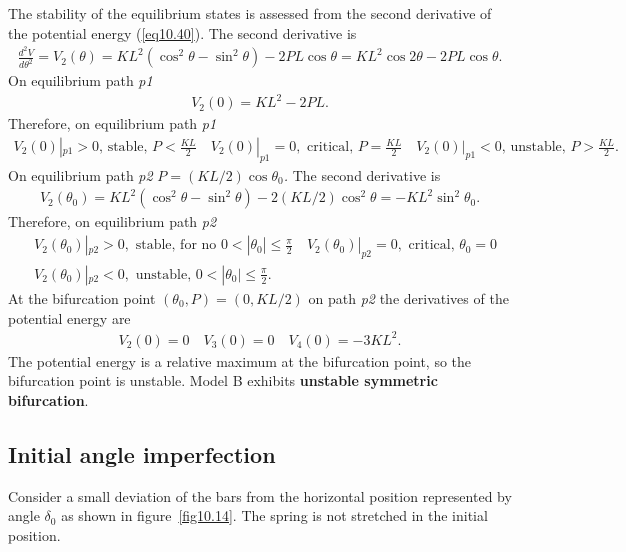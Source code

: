 \documentclass{AeroStructure-ERJohnson}
\begin{document}
The stability of the equilibrium states is assessed from the second derivative of the potential energy (\ref{eq10.40}). The second derivative is
\begin{align}\label{eq10.43}
\frac{d^{2} V}{d \theta^{2}}=V_{2}(\theta)=K L^{2}(\cos ^{2} \theta-\sin ^{2} \theta)-2 P L \cos \theta=K L^{2} \cos 2 \theta-2 P L \cos \theta.
\end{align}
On equilibrium path \textit{p1}
\begin{align}\label{eq10.44}
V_{2}(0)=K L^{2}-2 P L.
\end{align}
Therefore, on equilibrium path \textit{p1}
\begin{align}\label{eq10.45}
V_{2}(0)|_{p 1}>0 \text {, stable, } P<\frac{K L}{2} \quad V_{2}(0)|_{p 1}=0, \text { critical, } P=\frac{K L}{2} \quad V_{2}(0)|_{p 1}<0 \text {, unstable, } P>\frac{K L}{2}.
\end{align}
On equilibrium path \textit{p2 }$P=(K L / 2) \cos \theta_{0}$\textit{. }The second derivative is
\begin{align}\label{eq10.46}
V_{2}\left(\theta_{0}\right)=K L^{2}(\cos ^{2} \theta-\sin ^{2} \theta)-2(K L / 2) \cos ^{2} \theta=-K L^{2} \sin ^{2} \theta_{0}.
\end{align}
Therefore, on equilibrium path \textit{p2}
\begin{align}\label{eq10.47}
&V_{2}\left(\theta_{0}\right)|_{p 2}>0, \text { stable, for no } 0<|\theta_{0}| \leq\frac{\pi}{2} \quad V_{2}\left(\theta_{0}\right)|_{p 2}=0, \text { critical, } \theta_{0}=0 \nonumber\\ &V_{2}\left(\theta_{0}\right)|_{p 2}<0, \text { unstable, } 0<|\theta_{0}| \leq \frac{\pi}{2}.
\end{align}
At the bifurcation point $\left(\theta_{0}, P\right)=(0, K L / 2)$ on path \textit{p2} the derivatives of the potential energy are
\begin{align}\label{eq10.48}
V_{2}(0)=0 \quad V_{3}(0)=0 \quad V_{4}(0)=-3 K L^{2}.
\end{align}
The potential energy is a relative maximum at the bifurcation point, so the bifurcation point is unstable. Model B exhibits \textbf{unstable symmetric bifurcation}.


\subsection{Initial angle imperfection}\label{sec10.2.1}

Consider a small deviation of the bars from the horizontal position represented by angle $\delta_{0}$ as shown in figure~\ref{fig10.14}. The spring is not stretched in the initial position.
\end{document}
